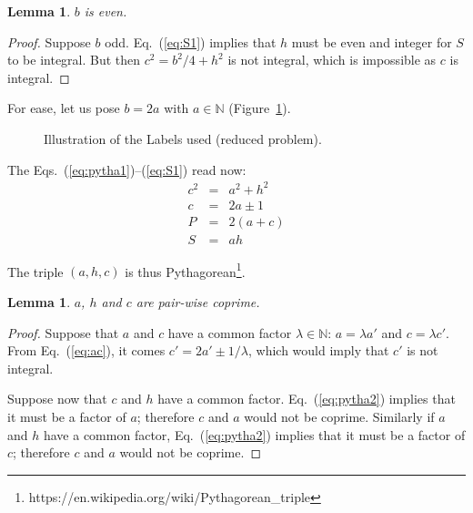 \documentclass[11pt, twoside, a4paper]{article}
\newtheorem{lemma}[theorem]{Lemma}
\theoremstyle{definition}
\newcommand{\Fig}[1]{Figure~\ref{fig:#1}}
\newcommand{\Eq}[1]{Eq.~(\ref{eq:#1})}
\newcommand{\Eqs}[2]{Eqs.~(\ref{eq:#1})--(\ref{eq:#2})}
\newcommand{\set}[1]{\mathbb{#1}}
\begin{document}
\begin{lemma}$b$ is even.\end{lemma}
\begin{proof} Suppose $b$ odd. \Eq{S1} implies that $h$ must be even and integer for $S$ to be integral. But then $c^2 = b^2/4 + h^2$ is not integral, which is impossible as $c$ is integral.
\end{proof}

For ease, let us pose $b=2a$ with $a\in\set N$ (\Fig{triangle2}). 
\begin{figure}
    \begin{center}
        \caption{Illustration of the Labels used (reduced problem).}
        \label{fig:triangle2}
    \end{center}
\end{figure}

The \Eqs{pytha1}{S1} read now:
\begin{eqnarray}
c^2 & = & a^2 + h^2  \label{eq:pytha2} \\
  c & = & 2a \pm 1  \label{eq:ac} \\
  P & = & 2(a+c) \\ 
  S & = & ah \label{eq:S2}
\end{eqnarray}

The triple $(a, h, c)$ is thus Pythagorean\footnote{https://en.wikipedia.org/wiki/Pythagorean\_triple}.

\begin{lemma}
	$a$, $h$ and $c$ are pair-wise coprime. 
\end{lemma}

\begin{proof} 
	Suppose that $a$ and $c$ have a common factor $\lambda\in\set N$: $a=\lambda a'$ and $c=\lambda c'$. From \Eq{ac}, it comes $c' = 2 a' \pm 1/\lambda$, which would imply that $c'$ is not integral.
	
	Suppose now that $c$ and $h$ have a common factor. \Eq{pytha2} implies that it must be a factor of $a$; therefore $c$ and $a$ would not be coprime. Similarly if $a$ and $h$ have a common factor, \Eq{pytha2} implies that it must be a factor of $c$; therefore $c$ and $a$ would not be coprime.
\end{proof}
\end{document}
